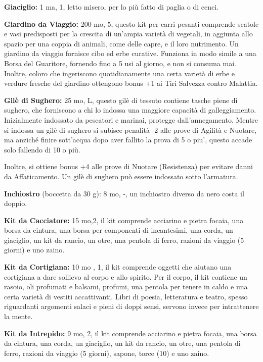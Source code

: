 \documentclass[a4paper,11pt,twoside,openany]{book}
\begin{document}
{\textbf{Giaciglio:} 1 ma, 1, letto misero, per lo più fatto di paglia o di cenci.

\textbf{Giardino da Viaggio:} 200 mo, 5, questo kit per carri pesanti comprende scatole e vasi predispo­sti per la crescita di un'ampia varietà di vegetali, in aggiunta allo spazio per una coppia di animali, come delle capre, e il loro nutrimento. Un giardino da viaggio fornisce cibo ed erbe curative. Funziona in modo simile a una Borsa del Guaritore, fornendo fino a 5 usi al giorno, e non si consuma mai. Inoltre, coloro che ingeriscono quotidianamente una certa varietà di ­erbe e verdure fresche del giardino ottengono bonus +1 ai Tiri Salvezza contro Malattia. 

\textbf{Gilè di Sughero:} 25 mo, L, questo gilè di tessuto contiene tasche piene di sughero, che forniscono a chi lo indossa una maggiore capacità di galleggiamento. Inizialmente indossato da pescatori e marinai, protegge dall'annegamento. Mentre si indossa un gilè di sughero si subisce penalità -2 alle prove di Agilità e Nuotare, ma anziché finire sott'acqua dopo aver fallito la prova di 5 o piu', questo accade solo fallendo di 10 o più. 

Inoltre, si ottiene bonus +4 alle prove di Nuotare (Resistenza) per evitare danni da Affaticamento. Un gilè di sughero può essere indossato sotto l'armatura.

\textbf{Inchiostro} (boccetta da 30 g): 8 mo, -, un inchiostro diverso da nero costa il doppio.

\textbf{Kit da Cacciatore:} 15 mo,2, il kit comprende acciarino e pietra focaia, una borsa da cin­tura, una borsa per componenti di incantesimi, una corda, un giaciglio, un kit da rancio, un otre, una pentola di ferro, razioni da viaggio (5 giorni) e uno zaino.

\textbf{Kit da Cortigiana:} 10 mo , 1, il kit comprende oggetti che aiutano una cortigiana a dare sollievo al corpo e allo spirito. Per il corpo, il kit contiene un rasoio, oli profumati e balsami, profumi, una pentola per tenere in caldo e una certa varietà di vestiti accattivanti. Libri di poesia, letteratura e teatro, spesso riguardanti argomenti salaci e pieni di doppi sensi, servono invece per intrattenere la mente.

\textbf{Kit da Intrepido:} 9 mo, 2, il kit comprende acciarino e pietra focaia, una borsa da cin­tura, una corda, un giaciglio, un kit da rancio, un otre, una pentola di ferro, razioni da viaggio (5 giorni), sapone, torce (10) e uno zaino.

}
\end{document}
